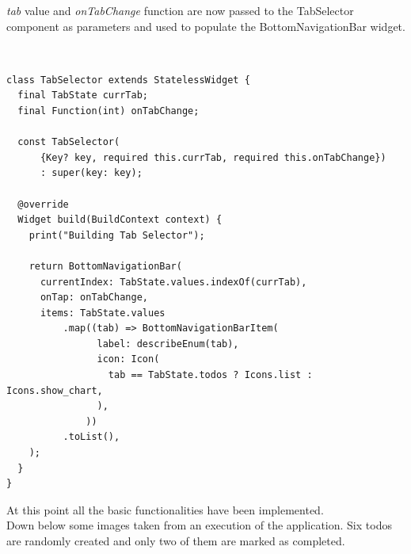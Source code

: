 \textit{tab} value and \textit{onTabChange} function are now passed to the TabSelector component as parameters and used to populate the BottomNavigationBar widget.

\mbox{}\\


\begin{verbatim}
class TabSelector extends StatelessWidget {
  final TabState currTab;
  final Function(int) onTabChange;

  const TabSelector(
      {Key? key, required this.currTab, required this.onTabChange})
      : super(key: key);

  @override
  Widget build(BuildContext context) {
    print("Building Tab Selector");

    return BottomNavigationBar(
      currentIndex: TabState.values.indexOf(currTab),
      onTap: onTabChange,
      items: TabState.values
          .map((tab) => BottomNavigationBarItem(
                label: describeEnum(tab),
                icon: Icon(
                  tab == TabState.todos ? Icons.list : Icons.show_chart,
                ),
              ))
          .toList(),
    );
  }
}

\end{verbatim}

 
At this point all the basic functionalities have been implemented. \\
Down below some images taken from an execution of the application. Six todos are randomly created and only two of them are marked as completed.

